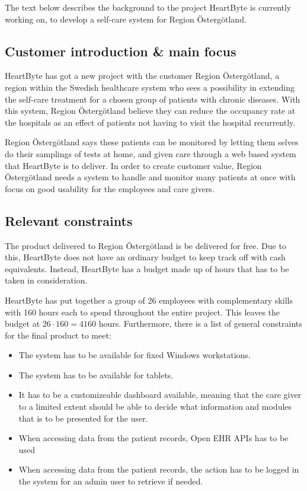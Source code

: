 \setlength{\parindent}{0pt}
The text below describes the background to the project HeartByte is currently working on, to develop a self-care system for Region Östergötland.

\subsection{Customer introduction \& main focus}
HeartByte has got a new project with the customer Region Östergötland, a region within the Swedish healthcare system who sees a possibility in extending the self-care treatment for a chosen group of patients with chronic diseases. With this system, Region Östergötland believe they can reduce the occupancy rate at the hospitals as an effect of patients not having to visit the hospital recurrently. \vspace{5mm}

Region Östergötland says these patients can be monitored by letting them selves do their samplings of tests at home, and given care through a web based system that HeartByte is to deliver. In order to create customer value, Region Östergötland needs a system to handle and monitor many patients at once with focus on good usability for the employees and care givers.

\subsection{Relevant constraints}
The product delivered to Region Östergötland is be delivered for free. Due to this, HeartByte does not have an ordinary budget to keep track off with cash equivalents. Instead, HeartByte has a budget made up of hours that has to be taken in consideration. \vspace{5mm}

HeartByte has put together a group of 26 employees with complementary skills with 160 hours each to spend throughout the entire project. This leaves the budget at $26 \cdot 160 = 4160$ hours. Furthermore, there is a list of general constraints for the final product to meet:

\begin{itemize}
    \item The system has to be available for fixed Windows workstations.
    \item The system has to be available for tablets. 
    \item It has to be a customizeable dashboard available, meaning that the care giver to a limited extent should be able to decide what information and modules that is to be presented for the user.  
    \item When accessing data from the patient records, Open EHR APIs has to be used
    \item When accessing data from the patient records, the action has to be logged in the system for an admin user to retrieve if needed.
\end{itemize}

